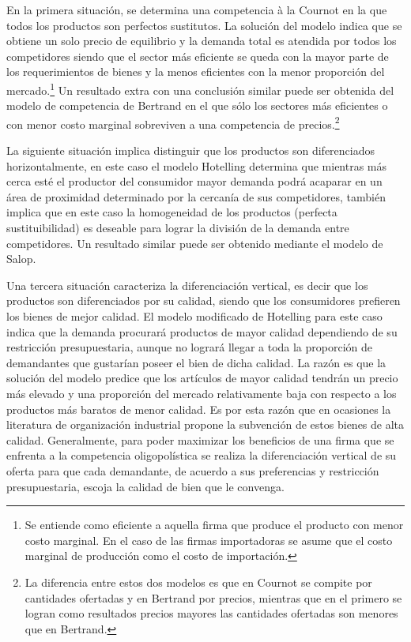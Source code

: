 \documentclass[12pt,letterpaper]{article}
\begin{document}
En la primera situación, se determina una competencia à la Cournot en la que todos los productos son perfectos sustitutos. La solución del modelo indica que se obtiene un solo precio de equilibrio y la demanda total es atendida por todos los competidores siendo que el sector más eficiente se queda con la mayor parte de los requerimientos de bienes y la menos eficientes con la menor proporción del mercado.\footnote{Se entiende como eficiente a aquella firma que produce el producto con menor costo marginal. En el caso de las firmas importadoras se asume que el costo marginal de producción como el costo de importación.} Un resultado extra con una conclusión similar puede ser obtenida del modelo de competencia de Bertrand en el que sólo los sectores más eficientes o con menor costo marginal sobreviven a una competencia de precios.\footnote{La diferencia entre estos dos modelos es que en Cournot se compite por cantidades ofertadas y en Bertrand por precios, mientras que en el primero se logran como resultados precios mayores las cantidades ofertadas son menores que en Bertrand.}

La siguiente situación implica distinguir que los productos son diferenciados horizontalmente, en este caso el modelo Hotelling determina que mientras más cerca esté el productor del consumidor mayor demanda podrá acaparar en un área de proximidad determinado por la cercanía de sus competidores, también implica que en este caso la homogeneidad de los productos (perfecta sustituibilidad) es deseable para lograr la división de la demanda entre competidores. Un resultado similar puede ser obtenido mediante el modelo de Salop.

Una tercera situación caracteriza la diferenciación vertical, es decir que los productos son diferenciados por su calidad, siendo que los consumidores prefieren los bienes de mejor calidad. El modelo modificado de Hotelling para este caso indica que la demanda procurará productos de mayor calidad dependiendo de su restricción presupuestaria, aunque no logrará llegar a toda la proporción de demandantes que gustarían poseer el bien de dicha calidad. La razón es que la solución del modelo predice que los artículos de mayor calidad tendrán un precio más elevado y una proporción del mercado relativamente baja con respecto a los productos más baratos de menor calidad. Es por esta razón que en ocasiones la literatura de organización industrial propone la subvención de estos bienes de alta calidad. Generalmente, para poder maximizar los beneficios de una firma que se enfrenta a la competencia oligopolística se realiza la diferenciación vertical de su oferta para que cada demandante, de acuerdo a sus preferencias y restricción presupuestaria, escoja la calidad de bien que le convenga.
\end{document}
